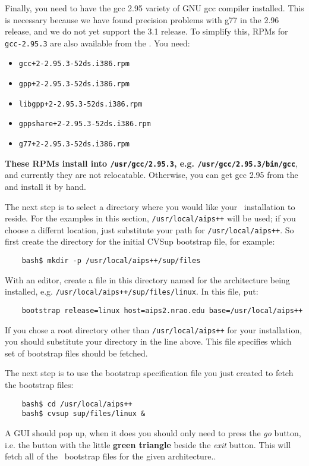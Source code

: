 Finally, you need to have the gcc 2.95 variety of GNU gcc compiler installed. This is
necessary because we have found precision problems with g77 in the 2.96 release, and
we do not yet support the 3.1 release. To simplify this, RPMs for \verb+gcc-2.95.3+
are also available from the
.
You need:
\begin{itemize}
\item {\tt gcc+2-2.95.3-52ds.i386.rpm}
\item {\tt gpp+2-2.95.3-52ds.i386.rpm}
\item {\tt libgpp+2-2.95.3-52ds.i386.rpm}
\item {\tt gppshare+2-2.95.3-52ds.i386.rpm}
\item {\tt g77+2-2.95.3-52ds.i386.rpm}
\end{itemize}
{\bf These RPMs install into \verb+/usr/gcc/2.95.3+, e.g. \verb+/usr/gcc/2.95.3/bin/gcc+}, and currently
they are not relocatable. Otherwise, you can get gcc 2.95 from the
 and
install it by hand.

The next step is to select a directory where you would like your \aipspp\ installation
to reside. For the examples in this section, {\tt /usr/local/aips++} will be
used; if you choose a differnt location, just substitute your path for
{\tt /usr/local/aips++}.  So first create the directory for the initial
CVSup bootstrap file, for example:
\begin{verbatim}
    bash$ mkdir -p /usr/local/aips++/sup/files
\end{verbatim}
With an editor, create a file in this directory named for the architecture
being installed, e.g. {\tt /usr/local/aips++/sup/files/linux}. In this file, put:
\begin{verbatim}
    bootstrap release=linux host=aips2.nrao.edu base=/usr/local/aips++
\end{verbatim}
If you chose a root directory other than {\tt /usr/local/aips++} for your
installation, you should substitute your directory in the line above. This
file specifies which set of bootstrap files should be fetched.

The next step is to use the bootstrap specification file you just created to
fetch the bootstrap files:
\begin{verbatim}
    bash$ cd /usr/local/aips++
    bash$ cvsup sup/files/linux &
\end{verbatim}
A GUI should pop up, when it does you should only need to press the {\em go}
button, i.e. the button with the little {\bf green triangle} beside the 
{\em exit} button. This will fetch all of the \aipspp\ bootstrap files for the
given architecture..

